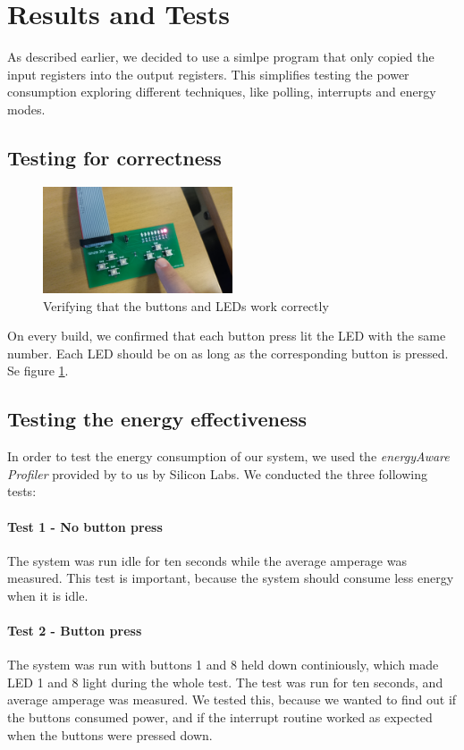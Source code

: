 \section{Results and Tests}
As described earlier, we decided to use a simlpe program that only copied the input registers into the output registers. This simplifies testing the power consumption exploring different techniques, like polling, interrupts and energy modes. 

	\subsection{Testing for correctness}
	\begin{figure}[t]
		\centerline{
			\includegraphics[width=0.5\textwidth]{img/test_correctness.jpg}
		}
		\caption{Verifying that the buttons and LEDs work correctly}
		\label{fig:test_correctness}
	\end{figure}
	On every build, we confirmed that each button press lit the LED with the same number. Each LED should be on as long as the corresponding button is pressed. Se figure \ref{fig:test_correctness}.

	\subsection{Testing the energy effectiveness}
	In order to test the energy consumption of our system, we used the \emph{energyAware Profiler} provided by to us by Silicon Labs. We conducted the three following tests:

		\paragraph{Test 1 - No button press} 
		The system was run idle for ten seconds while the average amperage was measured. This test is important, because the system should consume less energy when it is idle.

		\paragraph{Test 2 - Button press}
		The system was run with buttons 1 and 8 held down continiously, which made LED 1 and 8 light during the whole test. The test was run for ten seconds, and average amperage was measured. We tested this, because we wanted to find out if the buttons consumed power, and if the interrupt routine worked as expected when the buttons were pressed down.

